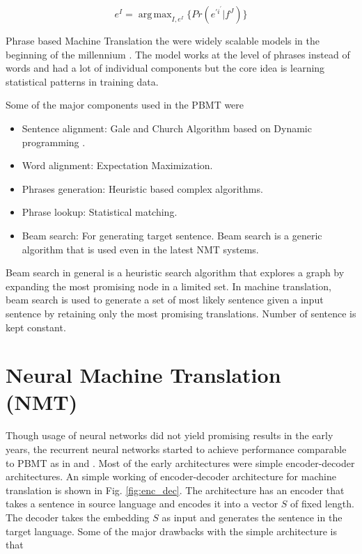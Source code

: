 \documentclass[a4paper]{article}
\DeclareMathOperator*{\argmax}{arg\,max}
\begin{document}
\begin{equation*}
  e^{I} = \argmax_{I,e^{I}} \Bigg\{Pr(e^{\prime i^\prime} | f^J) \Bigg\}
\end{equation*}


Phrase  based  Machine  Translation  the  were widely  scalable  models  in  the
beginning of the millennium \cite{koehn2003statistical}. The model works  at the
level of phrases instead of words and had a lot of individual components but the
core idea is learning statistical patterns in training data.

Some of the major components used in the PBMT were


\begin{itemize}
  \item Sentence  alignment:   Gale   and  Church  Algorithm  based  on  Dynamic
        programming \cite{lewis1994sequential}.
  \item Word alignment: Expectation Maximization.
  \item Phrases generation: Heuristic based complex algorithms.
  \item Phrase lookup: Statistical matching.
  \item Beam search:  For generating target sentence.  Beam search is a generic
        algorithm that is used even in the latest NMT systems.
\end{itemize}


Beam search in general is a heuristic search  algorithm that explores a graph by
expanding the most promising node in a limited set. In machine translation, beam
search is used to generate  a set of most likely sentence given a input sentence
by retaining  only the most promising  translations. Number of sentence  is kept
constant.


\section{Neural Machine Translation (NMT)}
Though usage of  neural networks did  not  yield  promising results in the early
years, the recurrent neural networks started to  achieve  performance comparable
to       PBMT       as       in       \cite{kalchbrenner2013recurrent}       and
\cite{hermann2013multilingual}. Most  of  the  early architectures  were  simple
encoder-decoder architectures. An simple working of encoder-decoder architecture
for machine translation is shown in Fig. \ref{fig:enc_dec}. The architecture has
an encoder that takes a sentence in source language and encodes it into a vector
$S$ of fixed length. The decoder takes the embedding $S$ as  input and generates
the sentence in the target language. Some of the major drawbacks with the simple
architecture is that
\end{document}
